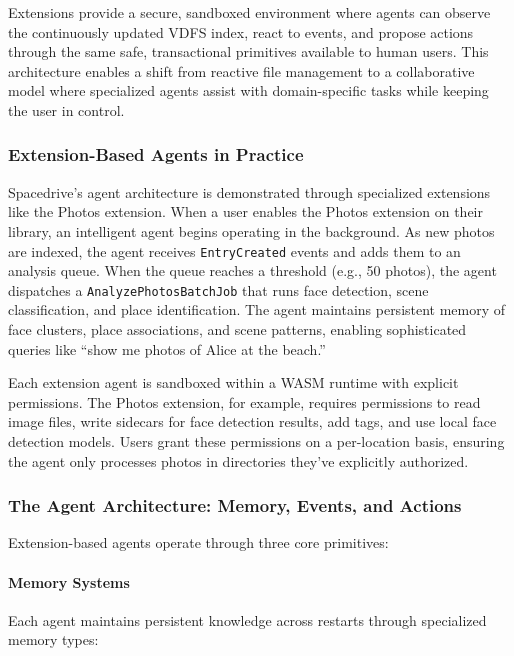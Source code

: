 \documentclass[sigconf]{acmart}
\begin{document}
Extensions provide a secure, sandboxed environment where agents can observe the continuously updated VDFS index, react to events, and propose actions through the same safe, transactional primitives available to human users. This architecture enables a shift from reactive file management to a collaborative model where specialized agents assist with domain-specific tasks while keeping the user in control.

\subsubsection{Extension-Based Agents in Practice}

Spacedrive's agent architecture is demonstrated through specialized extensions like the Photos extension. When a user enables the Photos extension on their library, an intelligent agent begins operating in the background. As new photos are indexed, the agent receives \texttt{EntryCreated} events and adds them to an analysis queue. When the queue reaches a threshold (e.g., 50 photos), the agent dispatches a \texttt{AnalyzePhotosBatchJob} that runs face detection, scene classification, and place identification. The agent maintains persistent memory of face clusters, place associations, and scene patterns, enabling sophisticated queries like ``show me photos of Alice at the beach.''

Each extension agent is sandboxed within a WASM runtime with explicit permissions. The Photos extension, for example, requires permissions to read image files, write sidecars for face detection results, add tags, and use local face detection models. Users grant these permissions on a per-location basis, ensuring the agent only processes photos in directories they've explicitly authorized.

\subsubsection{The Agent Architecture: Memory, Events, and Actions}

Extension-based agents operate through three core primitives:

\paragraph{Memory Systems}
Each agent maintains persistent knowledge across restarts through specialized memory types:
\end{document}
